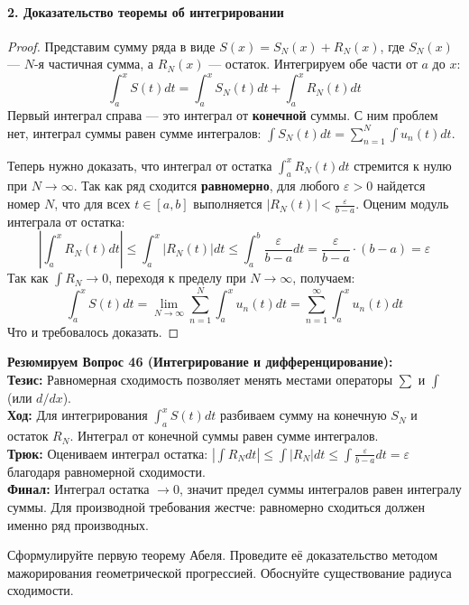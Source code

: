\paragraph{2. Доказательство теоремы об интегрировании}
\begin{proof}
Представим сумму ряда в виде $S(x) = S_N(x) + R_N(x)$, где $S_N(x)$ — $N$-я частичная сумма, а $R_N(x)$ — остаток. Интегрируем обе части от $a$ до $x$:
$$ \int_a^x S(t) dt = \int_a^x S_N(t) dt + \int_a^x R_N(t) dt $$
Первый интеграл справа — это интеграл от \textbf{конечной} суммы. С ним проблем нет, интеграл суммы равен сумме интегралов: $\int S_N(t) dt = \sum_{n=1}^N \int u_n(t) dt$.

Теперь нужно доказать, что интеграл от остатка $\int_a^x R_N(t) dt$ стремится к нулю при $N \to \infty$. 
Так как ряд сходится \textbf{равномерно}, для любого $\varepsilon > 0$ найдется номер $N$, что для всех $t \in [a, b]$ выполняется $|R_N(t)| < \frac{\varepsilon}{b-a}$.
Оценим модуль интеграла от остатка:
$$ \left| \int_a^x R_N(t) dt \right| \le \int_a^x |R_N(t)| dt \le \int_a^b \frac{\varepsilon}{b-a} dt = \frac{\varepsilon}{b-a} \cdot (b-a) = \varepsilon $$
Так как $\int R_N \to 0$, переходя к пределу при $N \to \infty$, получаем:
$$ \int_a^x S(t) dt = \lim_{N \to \infty} \sum_{n=1}^N \int_a^x u_n(t) dt = \sum_{n=1}^{\infty} \int_a^x u_n(t) dt $$
Что и требовалось доказать.
\end{proof}
\begin{tcolorbox}[colback=gray!5, colframe=black, boxrule=0.5pt, arc=0pt]
\textbf{Резюмируем Вопрос 46 (Интегрирование и дифференцирование):} \\
\textbf{Тезис:} Равномерная сходимость позволяет менять местами операторы $\sum$ и $\int$ (или $d/dx$). \\
\textbf{Ход:} Для интегрирования $\int_a^x S(t)dt$ разбиваем сумму на конечную $S_N$ и остаток $R_N$. Интеграл от конечной суммы равен сумме интегралов. \\
\textbf{Трюк:} Оцениваем интеграл остатка: $|\int R_N dt| \le \int |R_N| dt \le \int \frac{\varepsilon}{b-a} dt = \varepsilon$ благодаря равномерной сходимости. \\
\textbf{Финал:} Интеграл остатка $\to 0$, значит предел суммы интегралов равен интегралу суммы. Для производной требования жестче: равномерно сходиться должен именно ряд производных.
\end{tcolorbox}



{Сформулируйте первую теорему Абеля. Проведите её доказательство методом мажорирования геометрической прогрессией. Обоснуйте существование радиуса сходимости.}


